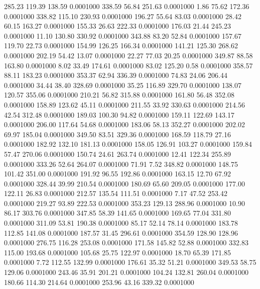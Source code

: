 285.23  119.39  138.59   0.0001000
 338.59   56.84  251.63   0.0001000
   1.86   75.62  172.36   0.0001000
 338.82  115.10  230.93   0.0001000
 196.27   55.64   83.03   0.0001000
  28.42   60.15  163.27   0.0001000
 155.33   26.63  222.33   0.0001000
 176.03   21.44  245.23   0.0001000
  11.10  130.80  330.92   0.0001000
 343.88   83.20   52.84   0.0001000
 157.67  119.70   22.73   0.0001000
 154.99  126.25  166.34   0.0001000
 141.21  125.30  268.62   0.0001000
 202.19   54.42   13.07   0.0001000
  22.27   77.03   20.25   0.0001000
 349.87   88.58  163.80   0.0001000
   8.02   33.49  174.61   0.0001000
  83.02  125.20    0.58   0.0001000
 358.57   88.11  183.23   0.0001000
 353.37   62.94  336.39   0.0001000
  74.83   24.06  206.44   0.0001000
  34.44   38.40  328.69   0.0001000
  35.25  116.89  329.70   0.0001000
 138.07  120.57  355.06   0.0001000
 210.21   56.82  315.88   0.0001000
 161.80   56.48  352.08   0.0001000
 158.89  123.62   45.11   0.0001000
 211.55   33.92  330.63   0.0001000
 214.56   42.54  312.48   0.0001000
 189.03  100.30   94.82   0.0001000
 159.11  122.69  143.17   0.0001000
 206.00  117.64   54.68   0.0001000
 183.06   58.13  352.27   0.0001000
 202.02   69.97  185.04   0.0001000
 349.50   83.51  329.36   0.0001000
 168.59  118.79   27.16   0.0001000
 182.92  132.10  181.13   0.0001000
 158.05  126.91  103.27   0.0001000
 159.84   57.47  270.06   0.0001000
 150.74   24.61  263.74   0.0001000
  12.41  122.34  255.89   0.0001000
 333.26   52.64  264.07   0.0001000
  71.91    7.52  348.82   0.0001000
 148.75  101.42  351.00   0.0001000
 191.92   96.55  192.86   0.0001000
 163.15   12.70   67.92   0.0001000
 328.44   39.99  210.54   0.0001000
 180.69   65.60  209.05   0.0001000
 177.00  122.11   26.83   0.0001000
 212.57  135.54  111.51   0.0001000
   7.17   47.52  253.42   0.0001000
 219.27   93.89  222.53   0.0001000
 353.23  129.13  288.96   0.0001000
  10.90   86.17  303.76   0.0001000
 347.85   58.39  141.65   0.0001000
 169.65   77.04  331.80   0.0001000
 311.09   53.81  190.38   0.0001000
  85.17   52.14   78.14   0.0001000
 183.78  112.85  141.08   0.0001000
 187.57   31.45  296.61   0.0001000
 354.59  128.90  128.96   0.0001000
 276.75  116.28  253.08   0.0001000
 171.58  145.82   52.88   0.0001000
 332.83  115.00  193.68   0.0001000
 105.68   25.75  122.97   0.0001000
  18.70   65.39  171.85   0.0001000
   7.72  112.55  132.99   0.0001000
 176.61   35.32   51.21   0.0001000
 349.53   58.75  129.06   0.0001000
 243.46   35.91  201.21   0.0001000
 104.24  132.81  260.04   0.0001000
 180.66  114.30  214.64   0.0001000
 253.96   43.16  339.32   0.0001000
